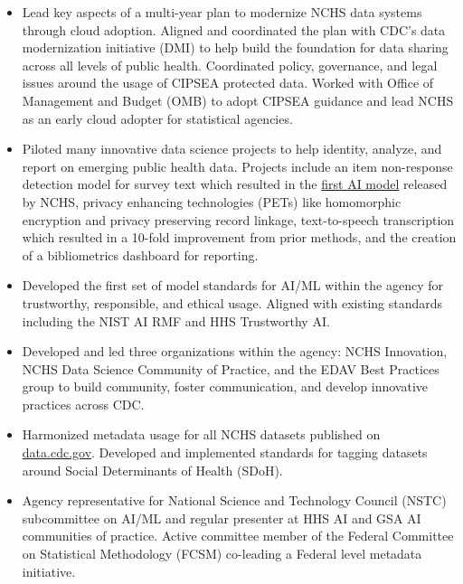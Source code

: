 \documentclass[]{scrartcl}
\begin{document}
\begin{cleanCV}
{\begin{itemize}
  \item Lead key aspects of a multi-year plan to modernize NCHS data systems through cloud adoption. Aligned and coordinated the plan with CDC's data modernization initiative (DMI) to help build the foundation for data sharing across all levels of public health. Coordinated policy, governance, and legal issues around the usage of CIPSEA protected data. Worked with Office of Management and Budget (OMB) to adopt CIPSEA guidance and lead NCHS as an early cloud adopter for statistical agencies.
    
        \item Piloted many innovative data science projects to help identity, analyze, and report on emerging public health data. Projects include an item non-response detection model for survey text which resulted in the \href{https://www.cdc.gov/nchs/data-science/SANDS-model-context.htm}{first AI model} released by NCHS, privacy enhancing technologies (PETs) like homomorphic encryption and privacy preserving record linkage, text-to-speech transcription which resulted in a 10-fold improvement from prior methods, and the creation of a bibliometrics dashboard for reporting.
    
  \item Developed the first set of model standards for AI/ML within the agency for trustworthy, responsible, and ethical usage. Aligned with existing standards including the NIST AI RMF and HHS Trustworthy AI.
    
  \item Developed and led three organizations within the agency: NCHS Innovation, NCHS Data Science Community of Practice, and the EDAV Best Practices group to build community, foster communication, and develop innovative practices across CDC.

  \item Harmonized metadata usage for all NCHS datasets published on \href{https://data.cdc.gov/browse?category=NCHS}{data.cdc.gov}. Developed and implemented standards for tagging datasets around Social Determinants of Health (SDoH).
    
      \item Agency representative for National Science and Technology Council (NSTC) subcommittee on AI/ML and regular presenter at HHS AI and GSA AI communities of practice. Active committee member of the Federal Committee on Statistical Methodology (FCSM) co-leading a Federal level metadata initiative.

  \end{itemize}
}


\end{cleanCV}
\end{document}
